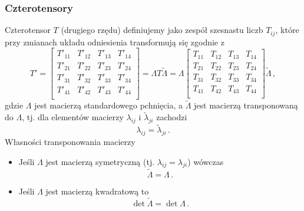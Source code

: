\documentclass[../main.tex]{subfiles}
\begin{document}
\subsubsection{Czterotensory}
Czterotensor \(T\) (drugiego rzędu) definiujemy jako zespół szesnastu liczb \(T_{ij}\), które przy zmianach układu odniesienia transformują się zgodnie z
\begin{equation*}
    T'=\left[\begin{array}{cccc}
         T'_{11}&T'_{12}&T'_{13}&T'_{14}  \\
         T'_{21}&T'_{22}&T'_{23}&T'_{24}  \\
         T'_{31}&T'_{32}&T'_{33}&T'_{34}  \\
         T'_{41}&T'_{42}&T'_{43}&T'_{44}  \\
    \end{array}\right]=\Lambda T\tilde{\Lambda}=\Lambda \left[\begin{array}{cccc}
         T_{11}&T_{12}&T_{13}&T_{14}  \\
         T_{21}&T_{22}&T_{23}&T_{24}  \\
         T_{31}&T_{32}&T_{33}&T_{34}  \\
         T_{41}&T_{42}&T_{43}&T_{44}  \\
    \end{array}\right]\tilde{\Lambda}\,,
\end{equation*}
gdzie \(\Lambda\) jest macierzą standardowego pchnięcia, a \(\tilde{\Lambda}\) jest macierzą transponowaną do \(\Lambda\), tj. dla elementów macierzy \(\lambda_{ij}\) i \(\tilde{\lambda}_{ji}\) zachodzi
\begin{equation*}
    \lambda_{ij}=\tilde{\lambda}_{ji}\,.
\end{equation*}
Własności transponowania macierzy
\begin{itemize}
    \item Jeśli \(\Lambda\) jest macierzą symetryczną (tj. \(\lambda_{ij}=\lambda_{ji}\)) wówczas
    \begin{equation*}
        \tilde{\Lambda}=\Lambda\,.
    \end{equation*}
    \item Jeśli \(\Lambda\) jest macierzą kwadratową to 
    \begin{equation*}
        \det \tilde{\Lambda}=\det \Lambda\,.
    \end{equation*}
\end{itemize}
\end{document}
